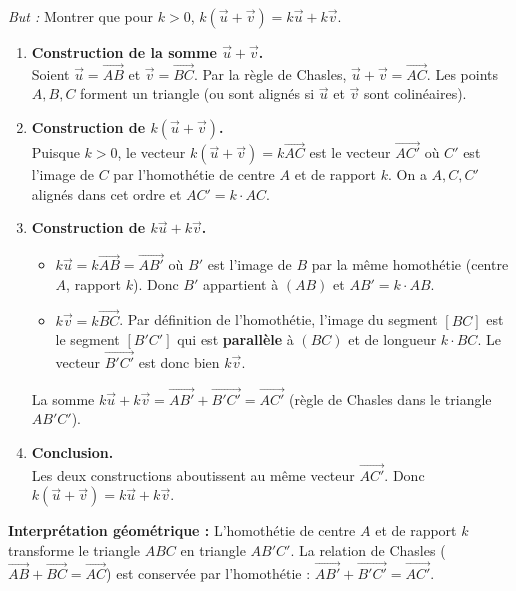 \documentclass[11pt]{article}
\begin{document}
\begin{experience}
\emph{But :} Montrer que pour $k > 0$, $k(\vec{u} + \vec{v}) = k\vec{u} + k\vec{v}$.

\begin{enumerate}
    \item \textbf{Construction de la somme $\vec{u} + \vec{v}$.} \\
    Soient $\vec{u} = \overrightarrow{AB}$ et $\vec{v} = \overrightarrow{BC}$. Par la règle de Chasles, $\vec{u} + \vec{v} = \overrightarrow{AC}$. Les points $A, B, C$ forment un triangle (ou sont alignés si $\vec{u}$ et $\vec{v}$ sont colinéaires).
    
    \item \textbf{Construction de $k(\vec{u} + \vec{v})$.} \\
    Puisque $k>0$, le vecteur $k(\vec{u} + \vec{v}) = k\overrightarrow{AC}$ est le vecteur $\overrightarrow{AC'}$ où $C'$ est l'image de $C$ par l'homothétie de centre $A$ et de rapport $k$. On a $A, C, C'$ alignés dans cet ordre et $AC' = k \cdot AC$.
    
    \item \textbf{Construction de $k\vec{u} + k\vec{v}$.} \\
    \begin{itemize}
        \item $k\vec{u} = k\overrightarrow{AB} = \overrightarrow{AB'}$ où $B'$ est l'image de $B$ par la même homothétie (centre $A$, rapport $k$). Donc $B'$ appartient à $(AB)$ et $AB' = k \cdot AB$.
        \item $k\vec{v} = k\overrightarrow{BC}$. Par définition de l'homothétie, l'image du segment $[BC]$ est le segment $[B'C']$ qui est \textbf{parallèle} à $(BC)$ et de longueur $k \cdot BC$. Le vecteur $\overrightarrow{B'C'}$ est donc bien $k\vec{v}$.
    \end{itemize}
    La somme $k\vec{u} + k\vec{v} = \overrightarrow{AB'} + \overrightarrow{B'C'} = \overrightarrow{AC'}$ (règle de Chasles dans le triangle $AB'C'$).
    
    \item \textbf{Conclusion.} \\
    Les deux constructions aboutissent au même vecteur $\overrightarrow{AC'}$. Donc $k(\vec{u} + \vec{v}) = k\vec{u} + k\vec{v}$.
\end{enumerate}

\medskip
\noindent \textbf{Interprétation géométrique :} L'homothétie de centre $A$ et de rapport $k$ transforme le triangle $ABC$ en triangle $AB'C'$. La relation de Chasles ($\overrightarrow{AB} + \overrightarrow{BC} = \overrightarrow{AC}$) est conservée par l'homothétie : $\overrightarrow{AB'} + \overrightarrow{B'C'} = \overrightarrow{AC'}$.
\end{experience}
\end{document}
